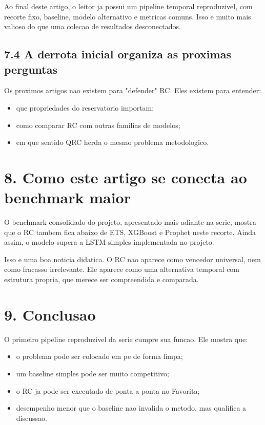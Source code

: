 \documentclass[12pt]{article}
\providecommand{\tightlist}{%
  \setlength{\itemsep}{0pt}\setlength{\parskip}{0pt}}
\begin{document}
Ao final deste artigo, o leitor ja possui um pipeline temporal reproduzivel, com recorte fixo, baseline, modelo alternativo e metricas comuns. Isso e muito mais valioso do que uma colecao de resultados desconectados.

\subsection{7.4 A derrota inicial organiza as proximas perguntas}\label{74-a-derrota-inicial-organiza-as-proximas-perguntas}

Os proximos artigos nao existem para "defender" RC. Eles existem para entender:

\begin{itemize}
\tightlist
\item
  que propriedades do reservatorio importam;
\item
  como comparar RC com outras familias de modelos;
\item
  em que sentido QRC herda o mesmo problema metodologico.
\end{itemize}

\section{8. Como este artigo se conecta ao benchmark maior}\label{8-como-este-artigo-se-conecta-ao-benchmark-maior}

O benchmark consolidado do projeto, apresentado mais adiante na serie, mostra que o RC tambem fica abaixo de ETS, XGBoost e Prophet neste recorte. Ainda assim, o modelo supera a LSTM simples implementada no projeto.

Isso e uma boa noticia didatica. O RC nao aparece como vencedor universal, nem como fracasso irrelevante. Ele aparece como uma alternativa temporal com estrutura propria, que merece ser compreendida e comparada.

\section{9. Conclusao}\label{9-conclusao}

O primeiro pipeline reproduzivel da serie cumpre sua funcao. Ele mostra que:

\begin{itemize}
\tightlist
\item
  o problema pode ser colocado em pe de forma limpa;
\item
  um baseline simples pode ser muito competitivo;
\item
  o RC ja pode ser executado de ponta a ponta no Favorita;
\item
  desempenho menor que o baseline nao invalida o metodo, mas qualifica a discussao.
\end{itemize}
\end{document}
